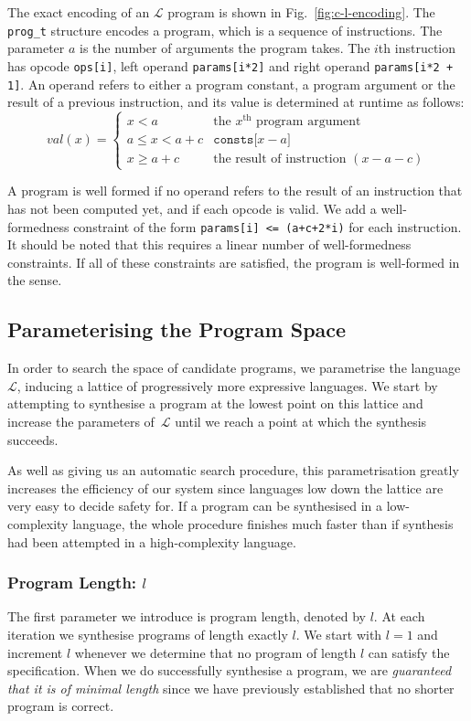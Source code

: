 The exact \newC encoding of an $\mathcal{L}$ program is shown in Fig.~\ref{fig:c-l-encoding}.
The \verb|prog_t| structure encodes a program, which is a sequence of instructions.
The parameter $a$ is the number of arguments the program takes.
The $i$th instruction has opcode \verb|ops[i]|, left operand \verb|params[i*2]| and
right operand \verb|params[i*2 + 1]|.  An operand refers to either a program constant,
a program argument or the result of a previous instruction, and its value
is determined at runtime as follows:
\[
 val(x) = \begin{cases}
           x < a & \text{the } x^{\text{th}} \text{ program argument} \\
           a \leq x < a+c & \mathtt{consts[} x-a \mathtt{]} \\
           x \geq a + c & \text{the result of instruction } (x - a - c)
          \end{cases}
\]


A program is well formed if
no operand refers to the result of an instruction that has not been computed yet, and if
each opcode is valid.  We add a well-formedness constraint of the form \verb|params[i] <= (a+c+2*i)|
for each instruction.  It should be noted that this requires a linear number of well-formedness
constraints.  If all of these constraints are satisfied, the program is well-formed in the sense.



\subsection{Parameterising the Program Space}

In order to search the space of candidate programs, we parametrise
the language~$\mathcal{L}$, inducing a lattice of progressively
more expressive languages.  We start by attempting to synthesise
a program at the lowest point on this lattice and increase the
parameters of~$\mathcal{L}$ until we reach a point at which
the synthesis succeeds.

As well as giving us an automatic search procedure, this parametrisation
greatly increases the efficiency of our system since languages
low down the lattice are very easy to decide safety for.  If a program
can be synthesised in a low-complexity language, the whole procedure
finishes much faster than if synthesis had been attempted in a
high-complexity language.

\subsubsection{Program Length: $l$}
The first parameter we introduce is program length, denoted by $l$.
At each iteration we synthesise programs of length exactly $l$.
We start with $l = 1$ and increment $l$ whenever we determine
that no program of length $l$ can satisfy the specification.  When we do
successfully synthesise a program, we are \emph{guaranteed that it
is of minimal length} since we have previously established that no
shorter program is correct.


